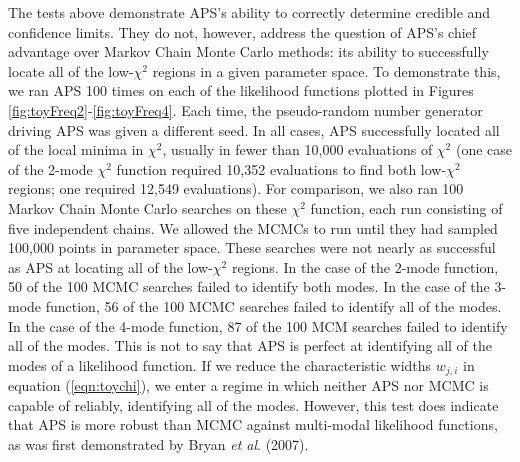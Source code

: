\documentclass[useAMS,usenatbib]{aastex}
\begin{document}
The tests above demonstrate APS's ability to correctly determine credible and
confidence limits.  They do not, however, address the question of APS's chief
advantage over Markov Chain Monte Carlo methods: its ability to successfully
locate all of the low-$\chi^2$ regions in a given parameter space.  To
demonstrate this, we ran APS 100 times on each of the likelihood functions
plotted in Figures \ref{fig:toyFreq2}-\ref{fig:toyFreq4}.  Each time, the
pseudo-random number generator driving APS was given a different seed.  In all
cases, APS successfully located all of the local minima in $\chi^2$, usually in
fewer than 10,000 evaluations of $\chi^2$ (one case of the 2-mode $\chi^2$
function required 10,352 evaluations to find both low-$\chi^2$ regions; one
required 12,549 evaluations).  For comparison, we also ran 100 Markov Chain
Monte Carlo searches on these $\chi^2$ function, each run consisting of five
independent chains.  We allowed the MCMCs to run
until they had sampled 100,000 points in parameter space.  
These searches were not nearly as successful as APS at
locating all of the low-$\chi^2$ regions.  In the case of the 2-mode function,
50 of the 100 MCMC searches failed to identify both modes.  In the case of the
3-mode function, 56 of the 100 MCMC searches failed to identify all of the
modes.  In the case of the 4-mode function, 87 of the 100 MCM searches failed to
identify all of the modes.  This is not to say that APS is perfect at
identifying all of the modes of a likelihood function.  If we reduce the
characteristic widths $w_{j,i}$ in equation (\ref{eqn:toychi}), we enter a regime
in which neither APS nor MCMC is capable of reliably,
identifying all of the modes.  However, this test does indicate that APS is more
robust than MCMC against multi-modal likelihood functions, as was first
demonstrated by Bryan {\it et al}. (2007).

\begin{figure*}
\caption{
This plot shows all 10 2-dimensional sub-spaces of our 5-dimensional toy likelihood
function with 2 minima in $\chi^2$.  The black points are $\chi^2\le\chi^2_\text{lim}$
found by APS after 10,000 samplings.  The red contours are the known $\chi^2=\chi^2_\text{lim}$
contours of the function.
}
\label{fig:toyFreq2}
\end{figure*}
\end{document}
